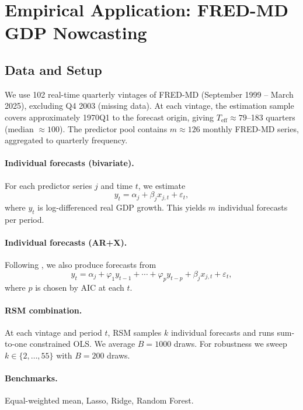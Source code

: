 \documentclass[12pt,a4paper]{article}
\begin{document}
\section{Empirical Application: FRED-MD GDP Nowcasting}

\subsection{Data and Setup}

We use 102 real-time quarterly vintages of FRED-MD (September 1999 --
March 2025), excluding Q4 2003 (missing data). At each vintage, the
estimation sample covers approximately 1970Q1 to the forecast origin,
giving $T_{\mathrm{eff}} \approx 79$--183 quarters (median $\approx 100$).
The predictor pool contains $m \approx 126$ monthly FRED-MD series,
aggregated to quarterly frequency.

\paragraph{Individual forecasts (bivariate).}
For each predictor series $j$ and time $t$, we estimate
\begin{equation}
y_t = \alpha_j + \beta_j x_{j,t} + \varepsilon_t,
\end{equation}
where $y_t$ is log-differenced real GDP growth. This yields $m$ individual
forecasts per period.

\paragraph{Individual forecasts (AR+X).}
Following \citet{ElliottEtAl2015}, we also produce forecasts from
\begin{equation}
y_t = \alpha_j + \varphi_1 y_{t-1} + \cdots + \varphi_p y_{t-p}
      + \beta_j x_{j,t} + \varepsilon_t,
\end{equation}
where $p$ is chosen by AIC at each $t$.

\paragraph{RSM combination.}
At each vintage and period $t$, RSM samples $k$ individual forecasts and
runs sum-to-one constrained OLS. We average $B=1000$ draws. For robustness
we sweep $k \in \{2,\ldots,55\}$ with $B=200$ draws.

\paragraph{Benchmarks.} Equal-weighted mean, Lasso, Ridge, Random Forest.
\end{document}

